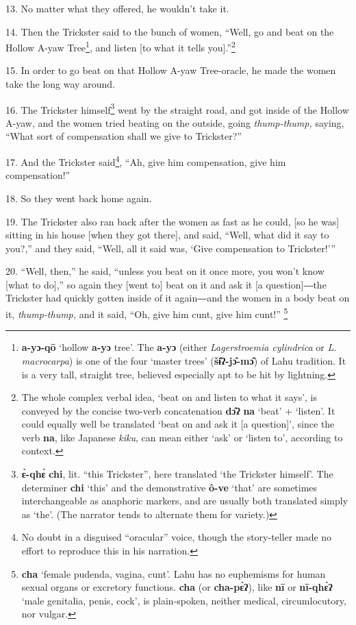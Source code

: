 13. No matter what they offered, he wouldn't take it.

14. Then the Trickster said to the bunch of women, ``Well, go and beat on the Hollow
A-yaw Tree\footnote{\textbf{a-yɔ-qō} `hollow \textbf{a-yɔ} tree'. The \textbf{a-yɔ} (either \textit{Lagerstroemia cylindrica }or \textit{L. macrocarpa}) is one of the four `master trees' (\textbf{šɨ̂ʔ-jɔ̂-mɔ̂}) of Lahu tradition. It is a very tall, straight tree, believed especially apt to be hit by lightning.}, and listen [to what it tells you].''\footnote{The whole complex verbal idea, `beat on and listen to what it says', is conveyed by the concise two-verb concatenation \textbf{dɔ̂ʔ} \textbf{na} `beat' + `listen'. It could equally well be translated `beat on and ask it [a question]', since the verb \textbf{na}, like Japanese \textit{kiku}, can mean either `ask' or `listen to', according to context.}

15. In order to go beat on that Hollow A-yaw Tree-oracle, he made the women take
the long way around.

16. The Trickster himself\footnote{\textbf{ɛ̀-qhɛ̀} \textbf{chi}, lit. ``this Trickster'', here translated `the Trickster himself'. The determiner \textbf{chi} `this' and the demonstrative \textbf{ô-ve} `that' are sometimes interchangeable as anaphoric markers, and are usually both translated simply as `the'. (The narrator tends to alternate them for variety.)} went by the straight road, and got inside of the
Hollow A-yaw, and the women tried beating on the outside, going \textit{thump-thump,
}saying, ``What sort of compensation shall we give to Trickster?''

17. And the Trickster said\footnote{No doubt in a disguised ``oracular'' voice, though the story-teller made no effort to reproduce this in his narration.}, ``Ah, give him compensation, give him compensation!''

18. So they went back home again.

19. The Trickster also ran back after the women as fast as he could, [so he was]
sitting in his house [when they got there], and said, ``Well, what did it say to
you?,'' and they said, ``Well, all it said was, `Give compensation to Trickster!'''

20. ``Well, then,'' he said, ``unless you beat on it once more, you won't know
[what to do],'' so again they [went to] beat on it and ask it [a question]―the
Trickster had quickly gotten inside of it again―and the women in a body beat
on it,\textit{ thump-thump, }and it said, ``Oh, give him cunt, give him cunt!''
\footnote{\textbf{cha} `female pudenda, vagina, cunt'. Lahu has no euphemisms for human sexual organs or excretory functions. \textbf{cha} (or \textbf{cha-pɛ̀ʔ}), like \textbf{nī} or \textbf{nī-qhɛ̀ʔ} `male genitalia, penis, cock', is plain-spoken, neither medical, circumlocutory, nor vulgar.}

